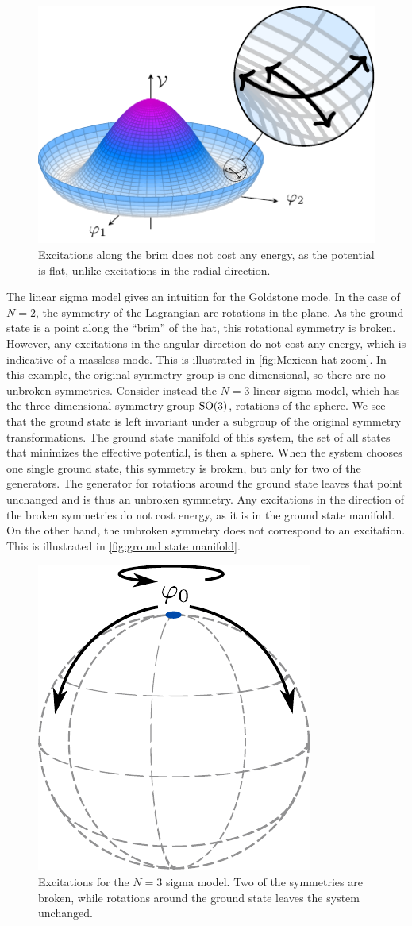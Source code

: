 \begin{figure}[ht]
    \centering
    \hspace*{2.5cm}
    \includegraphics[width=.6\linewidth]{figurer/mexican_hat_zoom.pdf}
    \caption{Excitations along the brim does not cost any energy, as the potential is flat, unlike excitations in the radial direction.}
    \label{fig:Mexican hat zoom}
\end{figure}

The linear sigma model gives an intuition for the Goldstone mode.
In the case of $N = 2$, the symmetry of the Lagrangian are rotations in the plane.
As the ground state is a point along the ``brim'' of the hat, this rotational symmetry is broken.
However, any excitations in the angular direction do not cost any energy, which is indicative of a massless mode.
This is illustrated in \autoref{fig:Mexican hat zoom}.
In this example, the original symmetry group is one-dimensional, so there are no unbroken symmetries.
Consider instead the $N=3$ linear sigma model, which has the three-dimensional symmetry group $\text{SO}(3)$, rotations of the sphere.
We see that the ground state is left invariant under a subgroup of the original symmetry transformations.
The ground state manifold of this system, the set of all states that minimizes the effective potential, is then a sphere.
When the system chooses one single ground state, this symmetry is broken, but only for two of the generators. 
The generator for rotations around the ground state leaves that point unchanged and is thus an unbroken symmetry.
Any excitations in the direction of the broken symmetries do not cost energy, as it is in the ground state manifold.
On the other hand, the unbroken symmetry does not correspond to an excitation.
This is illustrated in \autoref{fig:ground state manifold}.

\begin{figure}[h]
    \centering
    \includegraphics[width=.35\linewidth]{figurer/SU(3).pdf}
    \caption{Excitations for the $N=3$ sigma model. Two of the symmetries are broken, while rotations around the ground state leaves the system unchanged.}
    \label{fig:ground state manifold}
\end{figure}

